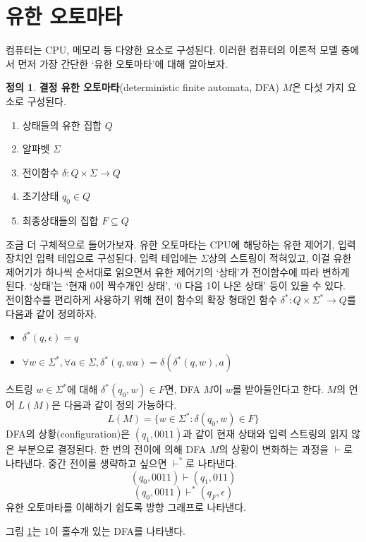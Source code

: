\documentclass[b5paper]{book}
\theoremstyle{definition}
\newtheorem{defn}{정의}[chapter]
\begin{document}
\section{유한 오토마타}
컴퓨터는 CPU, 메모리 등 다양한 요소로 구성된다. 
이러한 컴퓨터의 이론적 모델 중에서 먼저 가장 간단한 `유한 오토마타'에 대해 알아보자.
\begin{defn}
    \textbf{결정 유한 오토마타}(deterministic finite automata, DFA) $M$은 다섯 가지
요소로 구성된다.
\begin{enumerate}
    \item 상태들의 유한 집합 $Q$
    \item 알파벳 $\Sigma$
    \item 전이함수 $\delta : Q \times \Sigma \rightarrow Q$
    \item 초기상태 $q_0 \in Q$
    \item 최종상태들의 집합 $F \subseteq Q$
\end{enumerate}
\end{defn}
조금 더 구체적으로 들어가보자. 유한 오토마타는 CPU에 해당하는 유한 제어기,
입력장치인 입력 테입으로 구성된다. 입력 테입에는 $\Sigma$상의 스트링이
적혀있고, 이걸 유한 제어기가 하나씩 순서대로 읽으면서 유한 제어기의 `상태'가
전이함수에 따라 변하게 된다. `상태'는 `현재 0이 짝수개인 상태', `0 다음 1이 나온 상태' 등이
있을 수 있다. \\
전이함수를 편리하게 사용하기 위해 전이 함수의 확장 형태인 함수 $\delta^*: Q \times \Sigma^{*} 
\rightarrow Q$를 다음과 같이 정의하자.
\begin{itemize}
    \item $\delta^* (q, \epsilon) = q$
    \item $\forall w \in \Sigma^*, \forall a \in \Sigma, \delta^* (q, wa) = \delta(\delta^*(q,w),a)$
\end{itemize}
스트링 $w \in \Sigma^*$에 대해 $\delta^* (q_0, w ) \in F$면, DFA $M$이 $w$를 받아들인다고 한다.
$M$의 언어 $L(M)$은 다음과 같이 정의 가능하다.
$$L(M) = \{w \in \Sigma^* : \delta (q_0, w) \in F \}$$
DFA의 상황(configuration)은 $(q_1, 0011)$과 같이 
현재 상태와 입력 스트링의 읽지 않은 부분으로 결정된다. 
한 번의 전이에 의해 DFA $M$의 상황이 변화하는 과정을 $\vdash$로 나타낸다.
중간 전이를 생략하고 싶으면 $\vdash^*$로 나타낸다.
$$(q_0, 0011) \vdash (q_1, 011)$$
$$(q_0, 0011) \vdash^* (q_F, \epsilon)$$
유한 오토마타를 이해하기 쉽도록 방향 그래프로 나타낸다.
\begin{figure}[ht]
    \centering
    \caption{} 
    \label{1 odd}
\end{figure}
그림 \ref{1 odd}는 1이 홀수개 있는 DFA를 나타낸다.
\end{document}
